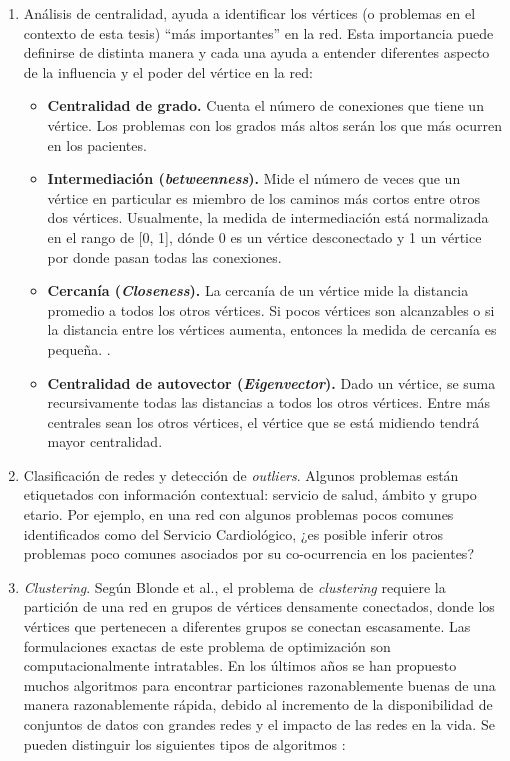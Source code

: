 \begin{enumerate}
  \item Análisis de centralidad, ayuda a identificar los vértices (o problemas en el contexto de esta tesis) “más importantes” en la red. Esta importancia puede definirse de distinta manera y cada una ayuda a entender diferentes aspecto de la influencia y el poder del vértice en la red:
  
\begin{itemize}
\item \textbf{Centralidad de grado.}
Cuenta el número de conexiones que tiene un vértice. Los problemas con los grados más altos serán los que más ocurren en los pacientes.
\item \textbf{Intermediación (\textit{betweenness}).} Mide el número de veces que un vértice en particular es miembro de los caminos más cortos entre otros dos vértices.
Usualmente, la medida de intermediación está normalizada en el rango de [0, 1], dónde 0 es un vértice desconectado y 1 un vértice por donde pasan todas las conexiones.\cite{Cook2006,Brath2015GraphData}
\item \textbf{Cercanía (\textit{Closeness}).} La cercanía de un vértice mide la distancia promedio a todos los otros vértices. Si pocos vértices son alcanzables o si la distancia entre los vértices aumenta, entonces la medida de cercanía es pequeña. \cite{Cook2006,Brath2015GraphData}.
\item \textbf{Centralidad de autovector (\textit{Eigenvector}).} Dado un vértice, se suma recursivamente todas las distancias a todos los otros vértices. Entre más centrales sean los otros vértices, el vértice que se está midiendo tendrá mayor centralidad\cite{Brath2015GraphData}.
\end{itemize}
\item Clasificación de redes y detección de \textit{outliers}. Algunos problemas están etiquetados con información contextual: servicio de salud, ámbito y grupo etario. Por ejemplo, en una red con algunos problemas pocos comunes identificados como del Servicio Cardiológico, ¿es posible inferir otros problemas poco comunes asociados por su co-ocurrencia en los pacientes?
  \item \textit{Clustering}. Según Blonde et al.\cite{Blondel2008FastNetworks}, el problema de \textit{clustering} requiere la partición de una red en grupos de vértices densamente conectados, donde los vértices que pertenecen a diferentes grupos se conectan escasamente. Las formulaciones exactas de este problema de optimización son computacionalmente intratables. En los últimos años se han propuesto muchos algoritmos para encontrar particiones razonablemente buenas de una manera razonablemente rápida, debido al incremento de la disponibilidad de conjuntos de datos con grandes redes y el impacto de las redes en la vida. Se pueden distinguir los siguientes tipos de algoritmos \label{par:algoritmos-nosupervisados}:

\end{enumerate}
